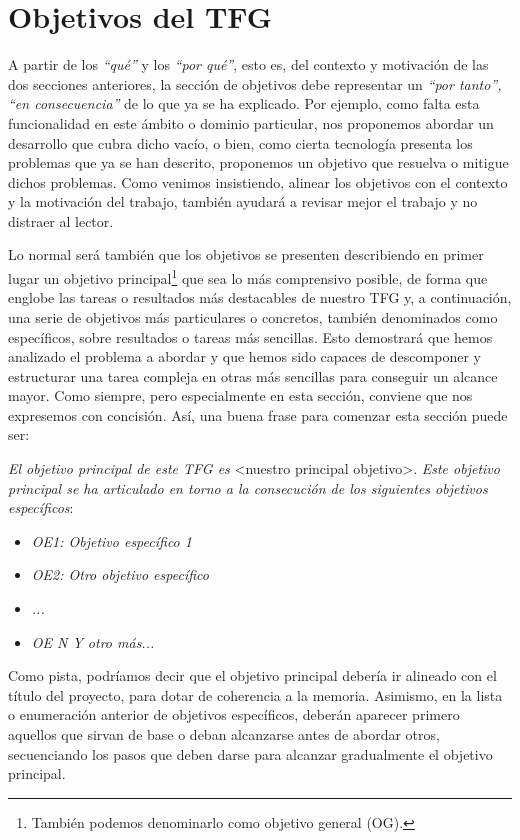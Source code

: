 \section{Objetivos del TFG}
A partir de los \textit{``qué''} y los \textit{``por qué''}, esto es, del contexto y motivación de las dos secciones anteriores, la sección de objetivos debe representar un \textit{``por tanto'', ``en consecuencia''} de lo que ya se ha explicado. Por ejemplo, como falta esta funcionalidad en este ámbito o dominio particular, nos proponemos abordar un desarrollo que cubra dicho vacío, o bien, como cierta tecnología presenta los problemas que ya se han descrito, proponemos un objetivo que resuelva o mitigue dichos problemas. Como venimos insistiendo, alinear los objetivos con el contexto y la motivación del trabajo, también ayudará a revisar mejor el trabajo y no distraer al lector.

Lo normal será también que los objetivos se presenten describiendo en primer lugar un objetivo principal\footnote{También podemos denominarlo como objetivo general (OG).} que sea lo más comprensivo posible, de forma que englobe las tareas o resultados más destacables de nuestro TFG y,  a continuación, una serie de objetivos más particulares o concretos, también denominados como específicos, sobre resultados o tareas más sencillas. Esto demostrará que hemos analizado el problema a abordar y que hemos sido capaces de descomponer y estructurar una tarea compleja en otras más sencillas para conseguir un alcance mayor. Como siempre, pero especialmente en esta sección, conviene que nos expresemos con concisión. Así, una buena frase para comenzar esta sección puede ser:

\textit{El objetivo principal de este TFG es } \textless nuestro principal objetivo\textgreater. \textit{Este objetivo principal se ha articulado en torno a la consecución de los siguientes objetivos específicos}:
\begin{itemize}
  \item \textit{OE1: Objetivo específico 1}
  \item \textit{OE2: Otro objetivo específico}
  \item \textit{...}
  \item \textit{OE N Y otro más...}
\end{itemize}

Como pista, podríamos decir que el objetivo principal debería ir alineado con el título del proyecto, para dotar de coherencia a la memoria. Asimismo, en la lista o enumeración anterior de objetivos específicos, deberán aparecer primero aquellos que sirvan de base o deban alcanzarse antes de abordar otros, secuenciando los pasos que deben darse para alcanzar gradualmente el objetivo principal.

